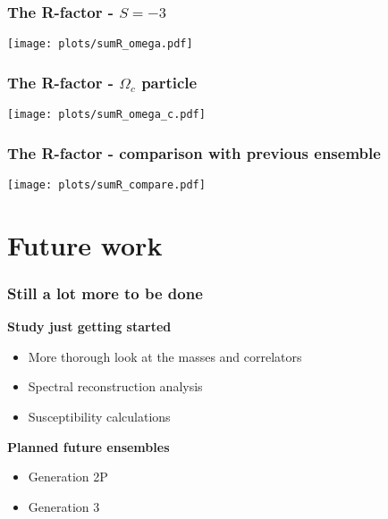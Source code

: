 \documentclass[11pt]{beamer}
\begin{document}
\begin{frame}
  \frametitle{The R-factor - $S = -3$}

  \vspace{6mm}
  \begin{center}
    \hspace*{-5mm}
    \texttt{[image: plots/sumR\_omega.pdf]}
  \end{center}

\end{frame}

\begin{frame}
  \frametitle{The R-factor - $\Omega_c$ particle}

  \vspace{6mm}
  \begin{center}
    \hspace*{-5mm}
    \texttt{[image: plots/sumR\_omega\_c.pdf]}
  \end{center}

\end{frame}

\begin{frame}
  \frametitle{The R-factor - comparison with previous ensemble}

  \vspace{6mm}
  \begin{center}
    \hspace*{-5mm}
    \texttt{[image: plots/sumR\_compare.pdf]}
  \end{center}

\end{frame}

\section{Future work}

\begin{frame}
  \frametitle{Still a lot more to be done}

  {\bfseries\color{ColourBase}Study just getting started}
  \begin{itemize}
    \item More thorough look at the masses and correlators
    \item Spectral reconstruction analysis
    \item Susceptibility calculations
  \end{itemize}

  \vspace{.5cm}

  {\bfseries\color{ColourHl1}Planned future ensembles}
  \begin{itemize}
    \item Generation \alert{2P} 
    \item Generation \alert{3}\hphantom{P} 
  \end{itemize}
\end{frame}
\end{document}

